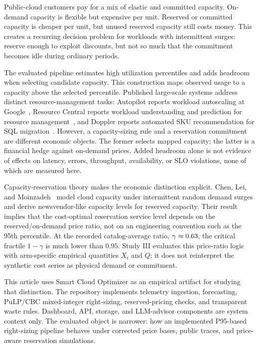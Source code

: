 \documentclass[11pt]{article}
\begin{document}
Public-cloud customers pay for a mix of elastic and committed capacity.
On-demand capacity is flexible but expensive per unit. Reserved or committed
capacity is cheaper per unit, but unused reserved capacity still costs money.
This creates a recurring decision problem for workloads with intermittent
surges: reserve enough to exploit discounts, but not so much that the
commitment becomes idle during ordinary periods.

The evaluated pipeline estimates high utilization percentiles and adds
headroom when selecting candidate capacity. This construction maps observed
usage to a capacity above the selected percentile. Published large-scale
systems address distinct resource-management tasks: Autopilot reports
workload autoscaling at Google~\cite{rzadca2020autopilot}, Resource Central
reports workload understanding and prediction for resource
management~\cite{cortez2017resource}, and Doppler reports automated SKU
recommendation for SQL migration~\cite{cahoon2022doppler}.
However, a capacity-sizing rule and a reservation commitment are different
economic objects. The former selects mapped capacity; the latter is a
financial hedge against on-demand prices. Added headroom alone is not evidence
of effects on latency, errors, throughput, availability, or SLO violations,
none of which are measured here.

Capacity-reservation theory makes the economic distinction explicit.
Chen, Lei, and Moinzadeh~\cite{chen2024capacity} model cloud capacity under
intermittent random demand surges and derive newsvendor-like capacity levels
for reserved capacity. Their result implies that the cost-optimal reservation
service level depends on the reserved/on-demand price ratio, not on an
engineering convention such as the 95th percentile. At the recorded
catalog-average ratio, $\gamma\approx0.63$, the critical fractile
$1-\gamma$ is much lower than $0.95$.
Study III evaluates this price-ratio logic with arm-specific empirical
quantities \(X_t\) and \(Q\); it does not reinterpret the synthetic cost series
as physical demand or commitment.

This article uses Smart Cloud Optimizer as an empirical artifact for studying
that distinction. The repository implements telemetry
ingestion, forecasting, PuLP/CBC mixed-integer right-sizing, reserved-pricing
checks, and transparent waste rules. Dashboard, API, storage, and LLM-advisor
components are system context only. The evaluated object is narrower: how an
implemented P95-based right-sizing pipeline behaves under corrected price
bases, public traces, and price-aware reservation simulations.
\end{document}
